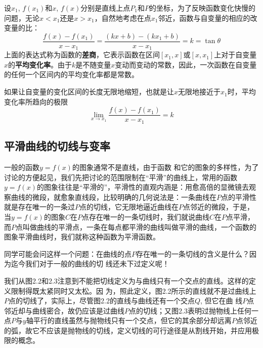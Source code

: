 设$x_1$, $f(x_1)$和$x$, $f(x)$分别是直线上点$P_1$和$P$的坐标，为了反映函数变化快慢的问题，无论$x<x_1$还是$x>x_1$，自然地考虑在点$x_1$邻近，函数与自变量的相应的改变量的比：
\[\frac{f(x)-f(x_1)}{x-x_1}=\frac{(kx+b)-(kx_1+b)}{x-x_1}=k=\tan\theta\]
上面的表达式称为函数的\textbf{差商}，它表示函数在区间$[x_1,x]$或$[x,x_1]$上对于自变量$x$的\textbf{平均变化率}。由于$k$是不随变量$x$变动而变动的常数，因此，一次函数在自变量的任何一个区间内的平均变化率都是常数。

如果让自变量的变化区间的长度无限地缩短，也就是让$x$无限地接近于$x_1$时，平均变化率所趋向的极限
\[\lim_{x\to x_1} \frac{f (x) -f (x_1)}{x-x_1} =k\]

\subsection{平滑曲线的切线与变率}
一般的函数$y=f(x)$的图象通常不是直线，由于函数
和它的图象的多样性，为了讨论的方便起见，我们先把讨论的范围限制在“平滑”的曲线上，常用的函数$y=f(x)$的图象往往是“平滑的”，平滑性的直观内涵是：用愈高倍的显微镜去观察曲线的微段，就愈象直线段，比较明确的几何说法是：一条曲线在$P$点的平滑性就是存在唯一的一条过$P$点的切线，它无限地逼近曲线在$P$点邻近的微段，于是，当$y=f(x)$的图象$C$在$P$点存在唯一的一条切线时，我们就说曲线$C$在$P$点平滑，而$P$点叫做曲线的平滑点，一条在每点都平滑的曲线叫做平滑的曲线，一个函数的图象平滑曲线时，我们就称这种函数为平滑函数。

同学可能会问这样一个问题：在曲线的点$P$存在唯一的一条切线的含义是什么？因为迄今我们对于一般的曲线的切
线还未下过定义呢！

我们从图2.2和2.3注意到不能把切线定义为与曲线只有一个交点的直线。这样的定义限制得既太紧同时又太松。因
为，照此定义，图2.2所示的直线就不是过曲线上$P$点的切线了，实际上，尽管图2.2的直线与曲线还有一个交点$Q$, 但它在曲
线$P$点邻近却与曲线密合，故仍应该是过曲线$P$点的切线；又图2.3表明过抛物线上任何一点$P$与$y$轴平行的直线虽然与抛物线只有一个交点，但它的其余部分却远离$P$点邻近的弧，故它不应该是抛物线的切线，定义切线的可行途径是从割线开始，并应用极限的概念。

